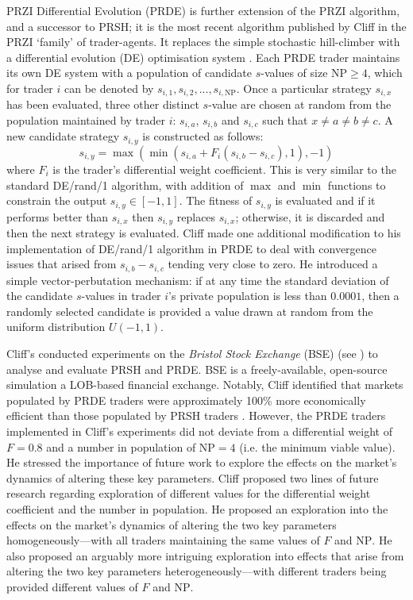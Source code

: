 \documentclass[conference]{IEEEtran}
\begin{document}
PRZI Differential Evolution (PRDE) \cite{PRDE} is further extension of the PRZI algorithm, and a successor to PRSH; it is the most recent algorithm published by Cliff in the PRZI `family' of trader-agents.
It replaces the simple stochastic hill-climber with a differential evolution (DE) optimisation system \cite{StornPrice}.
Each PRDE trader maintains its own DE system with a population of candidate $s$-values of size $\mathrm{NP}\ge4$, which for trader $i$ can be denoted by $s_{i,1},s_{i,2},...,s_{i,\mathrm{NP}}$.
Once a particular strategy $s_{i,x}$ has been evaluated, three other distinct $s$-value are chosen at random from the population maintained by trader $i$: $s_{i,a}$, $s_{i,b}$ and $s_{i,c}$ such that $x\ne a\ne b\ne c$.
A new candidate strategy $s_{i,y}$ is constructed as follows:
\[
s_{i,y}=\max(\min(s_{i,a}+F_i(s_{i,b}-s_{i,c}),1), -1)
\]
where $F_i$ is the trader's differential weight coefficient.
This is very similar to the standard DE/rand/1 algorithm, with addition of $\max$ and $\min$ functions to constrain the output $s_{i,y}\in[-1,1]$.
The fitness of $s_{i,y}$ is evaluated and if it performs better than $s_{i,x}$ then $s_{i,y}$ replaces $s_{i,x}$; otherwise, it is discarded and then the next strategy is evaluated.
Cliff made one additional modification to his implementation of DE/rand/1 algorithm in PRDE to deal with convergence issues that arised from $s_{i,b}-s_{i,c}$ tending very close to zero.
He introduced a simple vector-perbutation mechanism: if at any time the standard deviation of the candidate $s$-values in trader $i$'s private population is less than $0.0001$, then a randomly selected candidate is provided a value drawn at random from the uniform distribution $U(-1,1)$.

Cliff's conducted experiments on the \textit{Bristol Stock Exchange} (BSE) (see \cite{BSE, BSEPaper}) to analyse and evaluate PRSH and PRDE.
BSE is a freely-available, open-source simulation a LOB-based financial exchange.
Notably, Cliff identified that markets populated by PRDE traders were approximately 100\% more economically efficient than those populated by PRSH traders \cite{PRDE}.
However, the PRDE traders implemented in Cliff's experiments did not deviate from a differential weight of $F=0.8$ and a number in population of $\mathrm{NP}=4$ (i.e. the minimum viable value).
He stressed the importance of future work to explore the effects on the market's dynamics of altering these key parameters.
Cliff proposed two lines of future research regarding exploration of different values for the differential weight coefficient and the number in population.
He proposed an exploration into the effects on the market's dynamics of altering the two key parameters homogeneously---with all traders maintaining the same values of $F$ and $\mathrm{NP}$.
He also proposed an arguably more intriguing exploration into effects that arise from altering the two key parameters heterogeneously---with different traders being provided different values of $F$ and $\mathrm{NP}$.
\end{document}
